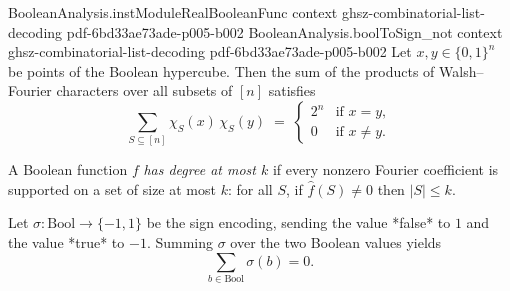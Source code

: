 \begin{lemma}
  {BooleanAnalysis.instModuleRealBooleanFunc}
  {context}
  {ghsz-combinatorial-list-decoding}
  {pdf-6bd33ae73ade-p005-b002}
\proofstep
  {BooleanAnalysis.boolToSign_not}
  {context}
  {ghsz-combinatorial-list-decoding}
  {pdf-6bd33ae73ade-p005-b002}
Let $x, y \in \{0,1\}^n$ be points of the Boolean hypercube. Then the sum of the
products of Walsh--Fourier characters over all subsets of $[n]$ satisfies
\[
  \sum_{S \subseteq [n]} \chi_S(x)\,\chi_S(y) \;=\;
  \begin{cases} 2^n & \text{if } x = y,\\[2pt] 0 & \text{if } x \neq y. \end{cases}
\]
\end{lemma}

\begin{definition}
\label{BooleanAnalysis.has_degree_at_most}
\leanok
{}
A Boolean function $f$ \emph{has degree at most $k$} if every nonzero Fourier
coefficient is supported on a set of size at most $k$: for all $S$, if
$\hat f(S)\ne 0$ then $|S|\le k$.
\end{definition}

\begin{lemma}
\label{BooleanAnalysis.sum_boolToSign}
\leanok
{}
Let $\sigma\colon\mathrm{Bool}\to\{-1,1\}$ be the sign encoding, sending the value
*false* to $1$ and the value *true* to $-1$. Summing $\sigma$ over the two Boolean
values yields
\[
  \sum_{b\in\mathrm{Bool}} \sigma(b) = 0.
\]
\end{lemma}

